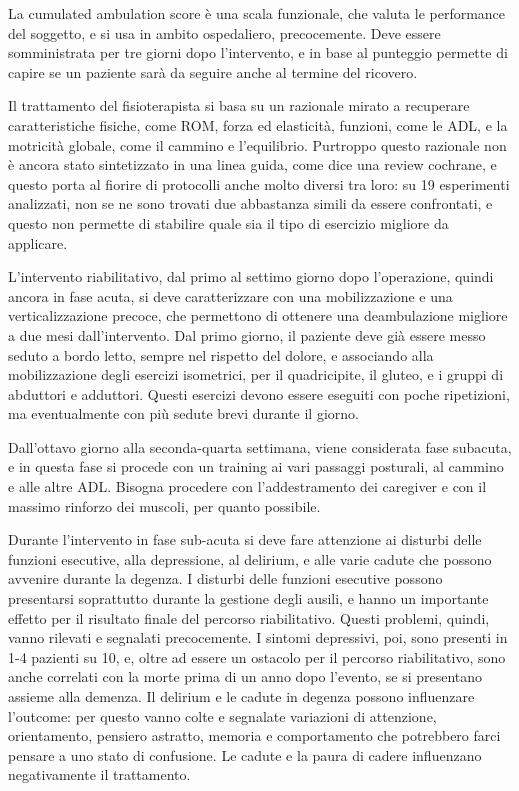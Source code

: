 La cumulated ambulation score è una scala funzionale, che valuta le performance
del soggetto, e si usa in ambito ospedaliero, precocemente.
Deve essere somministrata per tre giorni dopo l'intervento, e in base al
punteggio permette di capire se un paziente sarà da seguire anche al termine del
ricovero. 

Il trattamento del fisioterapista si basa su un razionale mirato a recuperare
caratteristiche fisiche, come ROM, forza ed elasticità, funzioni, come le ADL, e
la motricità globale, come il cammino e l'equilibrio. Purtroppo questo razionale
non è ancora stato sintetizzato in una linea guida, come dice una review
cochrane, e questo porta al fiorire di protocolli anche molto diversi tra loro: 
su 19 esperimenti analizzati, non se ne sono trovati due abbastanza simili da
essere confrontati, e questo non permette di stabilire quale sia il tipo di
esercizio migliore da applicare.

L'intervento riabilitativo, dal primo al settimo giorno dopo l'operazione,
quindi ancora in fase acuta, si deve caratterizzare con una mobilizzazione e una
verticalizzazione precoce, che permettono di ottenere una deambulazione migliore
a due mesi dall'intervento. Dal primo giorno, il paziente deve già essere messo
seduto a bordo letto, sempre nel rispetto del dolore, e associando alla
mobilizzazione degli esercizi isometrici, per il quadricipite, il gluteo, e i
gruppi di abduttori e adduttori. Questi esercizi devono essere eseguiti con
poche ripetizioni, ma eventualmente con più sedute brevi durante il giorno.

Dall'ottavo giorno alla seconda-quarta settimana, viene considerata fase
subacuta, e in questa fase si procede con un training ai vari passaggi
posturali, al cammino e alle altre ADL. Bisogna procedere con l'addestramento
dei caregiver e con il massimo rinforzo dei muscoli, per quanto possibile.

Durante l'intervento in fase sub-acuta si deve fare attenzione ai disturbi
delle funzioni esecutive, alla depressione, al delirium, e alle varie cadute
che possono avvenire durante la degenza. I disturbi delle funzioni esecutive
possono presentarsi soprattutto durante la gestione degli ausili, e hanno un
importante effetto per il risultato finale del percorso riabilitativo. Questi
problemi, quindi, vanno rilevati e segnalati precocemente. I sintomi depressivi,
poi, sono presenti in 1-4 pazienti su 10, e, oltre ad essere un ostacolo per il
percorso riabilitativo, sono anche correlati con la morte prima di un anno dopo
l'evento, se si presentano assieme alla demenza. Il delirium e le cadute in
degenza possono influenzare l'outcome: per questo vanno colte e segnalate
variazioni di attenzione, orientamento, pensiero astratto, memoria e
comportamento che potrebbero farci pensare a uno stato di confusione. Le cadute
e la paura di cadere influenzano negativamente il trattamento.

